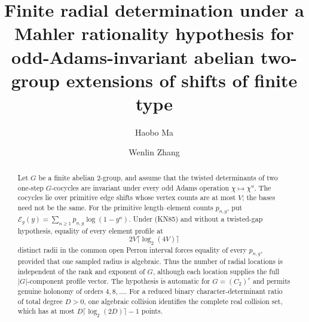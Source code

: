 \documentclass[11pt,a4paper]{amsart}
\title[Conditional finite radial determination]{Finite radial determination
under a Mahler rationality hypothesis for odd-Adams-invariant abelian
two-group extensions of shifts of finite type}
\author[Haobo Ma]{Haobo Ma}
\author[Wenlin Zhang]{Wenlin Zhang}
\date{}
\theoremstyle{plain}
\theoremstyle{definition}
\theoremstyle{remark}
\newcommand{\abs}[1]{\lvert #1 \rvert}
\begin{document}
\begin{abstract}
Let \(G\) be a finite abelian \(2\)-group, and assume that the twisted
determinants of two one-step \(G\)-cocycles are invariant under every odd
Adams operation \(\chi\mapsto\chi^u\).  The cocycles lie over primitive edge
shifts whose vertex counts are at most \(V\); the bases need not be the same.
For the primitive length--element counts \(p_{n,g}\), put
\(\mathcal E_g(y)=\sum_{n\ge1}p_{n,g}\log(1-y^n)\).  Under
\textup{(KN85)} and without a twisted-gap hypothesis, equality of every
element profile at
\[
 2V\lceil\log_2(4V)\rceil
\]
distinct radii in the common open Perron interval forces equality of every
\(p_{n,g}\), provided that one sampled radius is algebraic.  Thus the number
of radial locations is independent of the rank and exponent of \(G\), although
each location supplies the full \(\abs G\)-component profile vector.  The
hypothesis is automatic for \(G=(C_2)^r\) and permits genuine holonomy of
orders \(4,8,\ldots\).  For a reduced binary character-determinant ratio of
total degree \(D>0\), one algebraic collision identifies the complete real
collision set, which has at most
\(D\lceil\log_2(2D)\rceil-1\) points.


\end{abstract}
\end{document}
